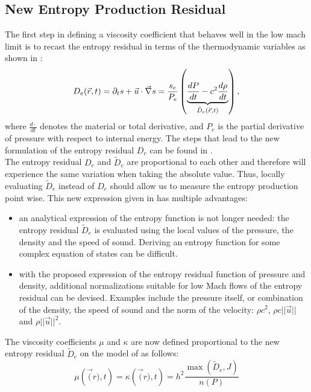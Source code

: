 \subsection{New Entropy Production Residual} 
The first step in defining a viscosity coefficient that behaves well in the low mach limit is to recast the entropy residual in terms of the thermodynamic variables as shown in :
\begin{equation}
\label{eq:ent_res}
D_e(\vec{r},t) = \partial_t s + \vec{u} \cdot \vec{\nabla} s = \frac{s_e}{P_e} \left( \underbrace{\frac{d P}{dt} - c^2 \frac{d \rho}{dt}}_{\tilde{D}_e(\vec{r},t)} \right),
\end{equation} 
where $\frac{d \cdot}{dt}$ denotes the material or total derivative, and $P_e$ is the partial derivative of pressure with respect to internal energy. The steps that lead to the new formulation of the entropy residual $D_e$ can be found in . \\
The entropy residual $D_e$ and $\tilde{D}_e$ are proportional to each other and therefore will experience the same variation when taking the absolute value. Thus,  locally evaluating $\tilde{D}_e$ instead of $D_e$ should allow us to measure the entropy production point wise. This new expression given in  has multiple advantages:
\begin{itemize}
\item an analytical expression of the entropy function is not longer needed: the entropy residual $\tilde{D}_e$ is evaluated using the local values of the pressure, the density and the speed of sound. Deriving an entropy function for some complex equation of states can be difficult.
\item with the proposed expression of the entropy residual function of pressure and density, additional normalizations suitable for low Mach flows of the entropy residual can be devised. Examples include the pressure itself, or combination of the density, the speed of sound and the norm of the velocity: $\rho c^2$, $\rho c || \vec{u} ||$ and $\rho || \vec{u} ||^2$. 
\end{itemize}
The viscosity coefficients $\mu$ and $\kappa$ are now defined proportional to the new entropy residual $\tilde{D}_e$ on the model of  as follows:
\begin{equation}
\mu \left( \vec(r),t \right) = \kappa \left( \vec(r),t \right) = h^2 \frac{\max \left( \tilde{D}_e, J \right)}{n(P)}
\end{equation}
